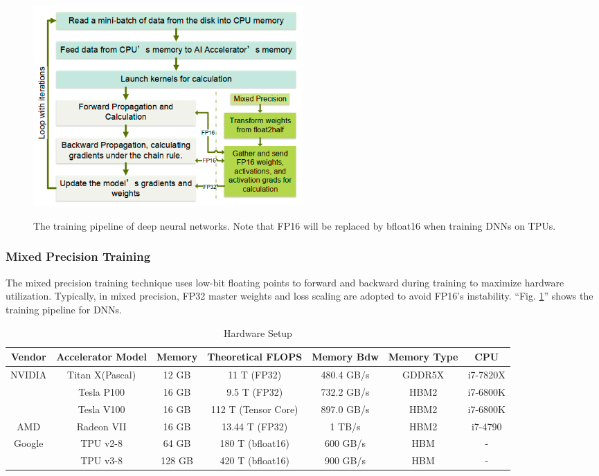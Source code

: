 \begin{figure}[htbp!]
    \centering
    {    \includegraphics[width=0.5\textwidth]{images/training_pipeline}}
    \caption{The training pipeline of deep neural networks. Note that FP16 will be replaced by bfloat16 when training DNNs on TPUs.}
    \label{fig:pipeline}
\end{figure}

\subsubsection{Mixed Precision Training}
The mixed precision training technique uses low-bit floating points to forward and backward during training
to maximize hardware utilization.
Typically, in mixed precision, FP32 master weights and loss scaling are adopted to avoid FP16's instability.
``Fig. \ref{fig:pipeline}'' shows the training pipeline for DNNs.

\begin{table}[h!]
    \centering
    \setlength\tabcolsep{8pt}
    \caption{Hardware Setup}
    \label{tab:hardware}
    \begin{tabular}{c c c c c c c}
        \toprule
        Vendor & Accelerator Model & Memory & Theoretical FLOPS   & Memory Bdw & Memory Type & CPU      \\
        \midrule
        NVIDIA & Titan X(Pascal)   & 12 GB  & 11 T (FP32)         & 480.4 GB/s & GDDR5X      & i7-7820X \\
        & Tesla P100        & 16 GB  & 9.5 T (FP32)        & 732.2 GB/s & HBM2        & i7-6800K \\
        & Tesla V100        & 16 GB  & 112 T (Tensor Core) & 897.0 GB/s & HBM2        & i7-6800K \\
        AMD    & Radeon VII        & 16 GB  & 13.44 T (FP32)      & 1 TB/s     & HBM2        & i7-4790  \\
        Google & TPU v2-8          & 64 GB  & 180 T (bfloat16)    & 600 GB/s   & HBM         & -        \\
        & TPU v3-8          & 128 GB & 420 T (bfloat16)    & 900 GB/s   & HBM         & -        \\
        \bottomrule
    \end{tabular}
\end{table}

